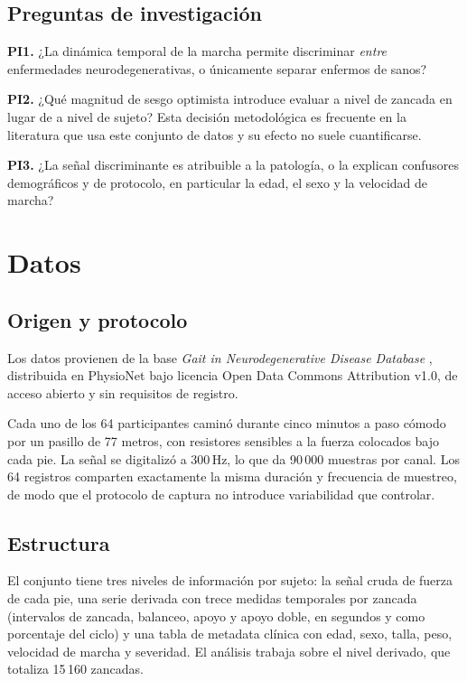 \documentclass[conference]{IEEEtran}
\begin{document}
\subsection{Preguntas de investigación}

\textbf{PI1.} ¿La dinámica temporal de la marcha permite discriminar \emph{entre} enfermedades neurodegenerativas, o únicamente separar enfermos de sanos?

\textbf{PI2.} ¿Qué magnitud de sesgo optimista introduce evaluar a nivel de zancada en lugar de a nivel de sujeto? Esta decisión metodológica es frecuente en la literatura que usa este conjunto de datos y su efecto no suele cuantificarse.

\textbf{PI3.} ¿La señal discriminante es atribuible a la patología, o la explican confusores demográficos y de protocolo, en particular la edad, el sexo y la velocidad de marcha?

\section{Datos}

\subsection{Origen y protocolo}

Los datos provienen de la base \textit{Gait in Neurodegenerative Disease Database} \cite{hausdorff2000}, distribuida en PhysioNet \cite{goldberger2000} bajo licencia Open Data Commons Attribution v1.0, de acceso abierto y sin requisitos de registro.

Cada uno de los 64 participantes caminó durante cinco minutos a paso cómodo por un pasillo de 77 metros, con resistores sensibles a la fuerza colocados bajo cada pie. La señal se digitalizó a 300\,Hz, lo que da 90\,000 muestras por canal. Los 64 registros comparten exactamente la misma duración y frecuencia de muestreo, de modo que el protocolo de captura no introduce variabilidad que controlar.

\subsection{Estructura}

El conjunto tiene tres niveles de información por sujeto: la señal cruda de fuerza de cada pie, una serie derivada con trece medidas temporales por zancada (intervalos de zancada, balanceo, apoyo y apoyo doble, en segundos y como porcentaje del ciclo) y una tabla de metadata clínica con edad, sexo, talla, peso, velocidad de marcha y severidad. El análisis trabaja sobre el nivel derivado, que totaliza 15\,160 zancadas.
\end{document}
